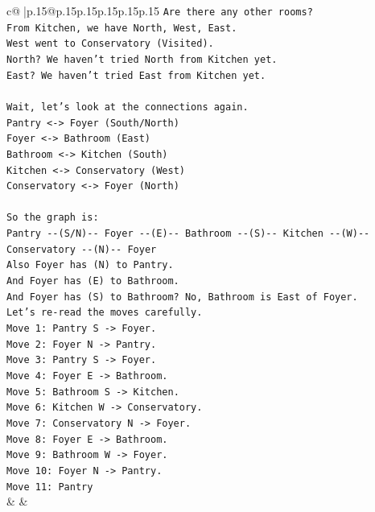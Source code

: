 \documentclass{article}
\begin{document}
{\begin{supertabular}{c@{$\;$}|p{.15\linewidth}@{}p{.15\linewidth}p{.15\linewidth}p{.15\linewidth}p{.15\linewidth}p{.15\linewidth}}
{{{\texttt{Are there any other rooms?} \\
\texttt{From Kitchen, we have North, West, East.} \\
\texttt{West went to Conservatory (Visited).} \\
\texttt{North? We haven't tried North from Kitchen yet.} \\
\texttt{East? We haven't tried East from Kitchen yet.} \\
\\ 
\texttt{Wait, let's look at the connections again.} \\
\texttt{Pantry <{-}> Foyer (South/North)} \\
\texttt{Foyer <{-}> Bathroom (East)} \\
\texttt{Bathroom <{-}> Kitchen (South)} \\
\texttt{Kitchen <{-}> Conservatory (West)} \\
\texttt{Conservatory <{-}> Foyer (North)} \\
\\ 
\texttt{So the graph is:} \\
\texttt{Pantry {-}{-}(S/N){-}{-} Foyer {-}{-}(E){-}{-} Bathroom {-}{-}(S){-}{-} Kitchen {-}{-}(W){-}{-} Conservatory {-}{-}(N){-}{-} Foyer} \\
\texttt{Also Foyer has (N) to Pantry.} \\
\texttt{And Foyer has (E) to Bathroom.} \\
\texttt{And Foyer has (S) to Bathroom? No, Bathroom is East of Foyer.} \\
\texttt{Let's re{-}read the moves carefully.} \\
\texttt{Move 1: Pantry S {-}> Foyer.} \\
\texttt{Move 2: Foyer N {-}> Pantry.} \\
\texttt{Move 3: Pantry S {-}> Foyer.} \\
\texttt{Move 4: Foyer E {-}> Bathroom.} \\
\texttt{Move 5: Bathroom S {-}> Kitchen.} \\
\texttt{Move 6: Kitchen W {-}> Conservatory.} \\
\texttt{Move 7: Conservatory N {-}> Foyer.} \\
\texttt{Move 8: Foyer E {-}> Bathroom.} \\
\texttt{Move 9: Bathroom W {-}> Foyer.} \\
\texttt{Move 10: Foyer N {-}> Pantry.} \\
\texttt{Move 11: Pantry} \\
            }
        }
    }
    & & \\ \\


\end{supertabular}}
\end{document}
